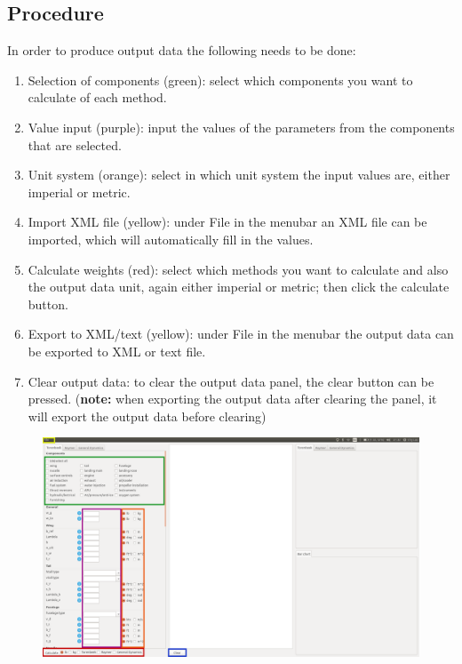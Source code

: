 \clearpage
\subsection{Procedure}
\noindent In order to produce output data the following needs to be done:
\begin{enumerate}
    \item Selection of components (green): select which components you want to calculate of each method.
    \item Value input (purple): input the values of the parameters from the components that are selected.
    \item Unit system (orange): select in which unit system the input values are, either imperial or metric.
    \item Import XML file (yellow): under File in the menubar an XML file can be imported, which will automatically fill in the values.
    \item Calculate weights (red): select which methods you want to calculate and also the output data unit, again either imperial or metric; then click the calculate button.
    \item Export to XML/text (yellow): under File in the menubar the output data can be exported to XML or text file.
    \item Clear output data: to clear the output data panel, the clear button can be pressed. (\textbf{note:} when exporting the output data after clearing the panel, it will export the output data before clearing)
\end{enumerate}

\begin{figure}[ht]
\includegraphics[width=1\textwidth]{image/gui_startup_boxes.png}
\end{figure}

